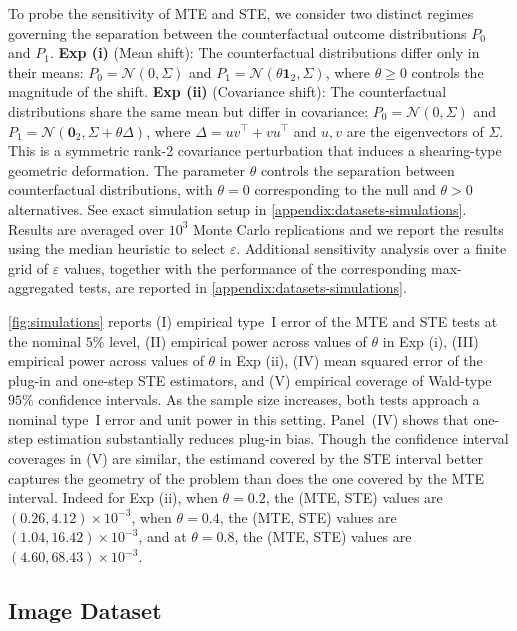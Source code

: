 \documentclass{article}
\theoremstyle{plain}
\theoremstyle{definition}
\theoremstyle{remark}
\newcommand{\cN}{\mathcal{N}}
\newcommand{\1}{\mathbbm{1}}
\newcommand{\eps}{\varepsilon}
\theoremstyle{plain}
\theoremstyle{definition}
\begin{document}
To probe the sensitivity of MTE and STE, we consider two distinct regimes governing the separation between the counterfactual outcome distributions $P_0$ and $P_1$.
\textbf{Exp (i)} (Mean shift): The counterfactual distributions differ only in their means: $P_0 = \cN(0, \Sigma)$ and $P_1 = \cN(\theta \mathbf{1}_2, \Sigma)$, where $\theta \geq 0$ controls the magnitude of the shift. \textbf{Exp (ii)} (Covariance shift): The counterfactual distributions share the same mean but differ in covariance: $P_0 = \cN(0, \Sigma)$ and $P_1 = \cN(\mathbf{0}_2, \Sigma + \theta \Delta)$, where $\Delta = uv^\top + vu^\top$ and $u, v$ are the eigenvectors of $\Sigma$. This is a symmetric rank-2 covariance perturbation that induces a shearing-type geometric deformation. The parameter $\theta$ controls the separation between counterfactual distributions, with $\theta=0$ corresponding to the null and $\theta>0$ alternatives. See exact simulation setup in \cref{appendix:datasets-simulations}. Results are averaged over $10^3$ Monte Carlo replications and we report the results using the median heuristic to select $\eps$. Additional sensitivity analysis over a finite grid of $\eps$ values, together with the performance of the corresponding max-aggregated tests, are reported in \cref{appendix:datasets-simulations}.


\cref{fig:simulations} reports
(I) empirical type~I error of the MTE and STE tests at the nominal $5\%$ level,
(II) empirical power across values of $\theta$ in Exp (i), (III) empirical power across values of $\theta$ in Exp (ii),
(IV) mean squared error of the plug-in and one-step STE estimators, and (V) empirical coverage of Wald-type $95\%$ confidence intervals.
As the sample size increases, both tests approach a nominal type~I error and unit
power in this setting.
Panel~(IV) shows that one-step estimation substantially reduces plug-in bias. 
Though the confidence interval coverages in (V) are similar, the estimand covered by the STE interval better captures the geometry of the problem than does the one covered by the MTE interval. Indeed for Exp (ii), when $\theta = 0.2$, the (MTE, STE) values are $(0.26, 4.12) \times 10^{-3}$, when $\theta = 0.4$, the (MTE, STE) values are $(1.04, 16.42) \times 10^{-3}$, and at $\theta = 0.8$, the (MTE, STE) values are $(4.60, 68.43) \times 10^{-3}$. 


\subsection{Image Dataset}
\end{document}
